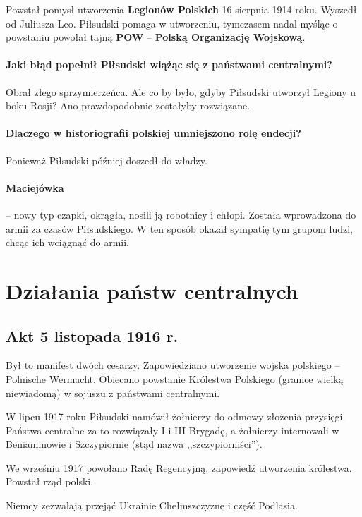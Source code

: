 \documentclass [a4paper, 11pt, oneside]{book}
\begin{document}
        Powstał pomysł utworzenia \textbf{Legionów Polskich} 16 sierpnia 1914 roku. Wyszedł od Juliusza Leo. Piłsudski pomaga w utworzeniu, tymczasem nadal myśląc o powstaniu powołał tajną \textbf{POW} -- \textbf{Polską Organizację Wojskową}.

        \paragraph{Jaki błąd popełnił Piłsudski wiążąc się z państwami centralnymi?} Obrał złego sprzymierzeńca. Ale co by było, gdyby Piłsudski utworzył Legiony u boku Rosji? Ano prawdopodobnie zostałyby rozwiązane.
        \paragraph{Dlaczego w historiografii polskiej umniejszono rolę endecji?} Ponieważ Piłsudski później doszedł do władzy.
        \paragraph{Maciejówka} -- nowy typ czapki, okrągła, nosili ją robotnicy i chłopi. Została wprowadzona do armii za czasów Piłsudskiego. W ten sposób okazał sympatię tym grupom ludzi, chcąc ich wciągnąć do armii.
    \section{Działania państw centralnych} %
    \label{sec:dzia_ania_pa_stw_centralnych}
        \subsection{Akt 5 listopada 1916 r.} %
        \label{sub:akt_5_listopada_1916_r_}
            Był to manifest dwóch cesarzy. Zapowiedziano utworzenie wojska polskiego -- Polnische Wermacht. Obiecano powstanie Królestwa Polskiego (granice wielką niewiadomą) w sojuszu z państwami centralnymi.

            W lipcu 1917 roku Piłsudski namówił żołnierzy do odmowy złożenia przysięgi. Państwa centralne za to rozwiązały I i III Brygadę, a żołnierzy internowali w Beniaminowie i Szczypiornie (stąd nazwa ,,szczypiorniści'').

            We wrześniu 1917 powołano Radę Regencyjną, zapowiedź utworzenia królestwa. Powstał rząd polski.

            Niemcy zezwalają przejąć Ukrainie Chełmszczyznę i część Podlasia.
\end{document}
